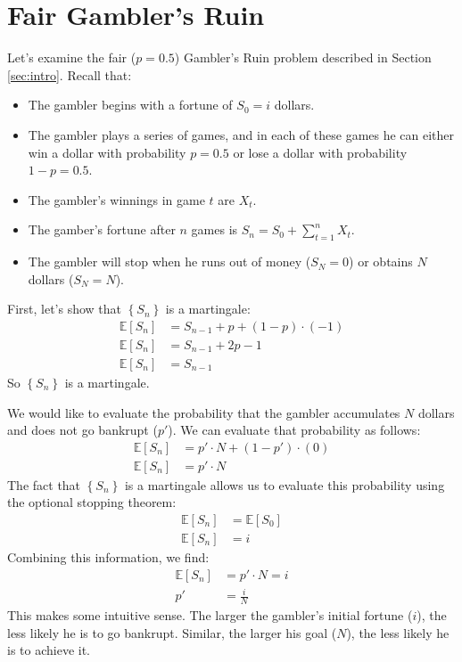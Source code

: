 \section{Fair Gambler's Ruin}
\label{sec:fair}

Let's examine the fair ($p = 0.5$) Gambler's Ruin
problem described in Section \ref{sec:intro}.
Recall that:
\begin{itemize}
  \item The gambler begins with a fortune of $S_0 = i$ dollars.
  \item The gambler plays a series of games, and in each of these games he can either win a dollar with probability $p = 0.5$ or lose a dollar with probability $1-p=0.5$.  
  \item The gambler's winnings in game $t$ are $X_t$.
  \item The gamber's fortune after $n$ games is $S_n = S_0 + \sum\limits_{t = 1}^{n}X_{t}$.
  \item The gambler will stop when he runs out of money ($S_N = 0$) or obtains $N$ dollars ($S_N = N$).
\end{itemize}

First, let's show that $\left\{S_n\right\}$ is a martingale:
\begin{align}
  \mathbb{E}[S_n] &= S_{n-1} + p + (1-p)\cdot(-1) \\
  \mathbb{E}[S_n] &= S_{n-1} + 2p - 1 \\
  \mathbb{E}[S_n] &= S_{n-1} 
\end{align}
So $\left\{S_n\right\}$ is a martingale.

We would like to evaluate the probability that the gambler accumulates $N$ dollars 
and does not go bankrupt ($p'$).  We can evaluate that probability as follows:
\begin{align}
  \mathbb{E}[S_n] &= p' \cdot N + (1-p') \cdot ( 0 ) \\
  \mathbb{E}[S_n] &= p' \cdot N 
\end{align}
The fact that $\left\{S_n\right\}$ is a martingale allows
us to evaluate this probability using the optional stopping theorem:
\begin{align}
  \mathbb{E}[S_n] &= \mathbb{E}[S_0] \\
  \mathbb{E}[S_n] &= i 
\end{align}
Combining this information, we find:
\begin{align}
  \mathbb{E}[S_n] &= p' \cdot N = i \\
  p' &= \frac{i}{N} 
\end{align}
This makes some intuitive sense.  The larger the gambler's initial 
fortune ($i$), the less likely he is to go bankrupt.
Similar, the larger his goal ($N$), the less likely he is to achieve it.

